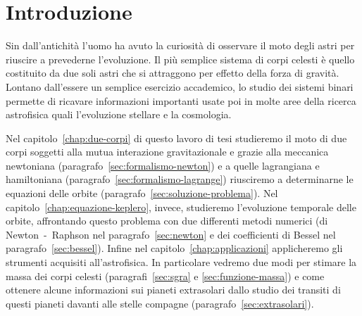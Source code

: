 \chapter{Introduzione}
\label{cha:introduzione}

Sin dall'antichità l'uomo ha avuto la curiosità di osservare il moto degli astri
per riuscire a prevederne l'evoluzione. Il più semplice sistema di corpi celesti
è quello costituito da due soli astri che si attraggono per effetto della forza
di gravità. Lontano dall'essere un semplice esercizio accademico, lo studio dei
sistemi binari permette di ricavare informazioni importanti usate poi in molte
aree della ricerca astrofisica quali l'evoluzione stellare e la cosmologia.

Nel capitolo~\ref{chap:due-corpi} di questo lavoro di tesi studieremo il moto di
due corpi soggetti alla mutua interazione gravitazionale e grazie alla meccanica
newtoniana (paragrafo~\ref{sec:formalismo-newton}) e a quelle lagrangiana e
hamiltoniana (paragrafo~\ref{sec:formalismo-lagrange}) riusciremo a determinarne
le equazioni delle orbite (paragrafo~\ref{sec:soluzione-problema}). Nel
capitolo~\ref{chap:equazione-keplero}, invece, studieremo l'evoluzione temporale
delle orbite, affrontando questo problema con due differenti metodi numerici (di
Newton~-~Raphson nel paragrafo~\ref{sec:newton} e dei coefficienti di Bessel nel
paragrafo~\ref{sec:bessel}). Infine nel capitolo~\ref{chap:applicazioni}
applicheremo gli strumenti acquisiti all'astrofisica. In particolare vedremo due
modi per stimare la massa dei corpi celesti (paragrafi~\ref{sec:sgra} e
\ref{sec:funzione-massa}) e come ottenere alcune informazioni sui pianeti
extrasolari dallo studio dei transiti di questi pianeti davanti alle stelle
compagne (paragrafo~\ref{sec:extrasolari}).

